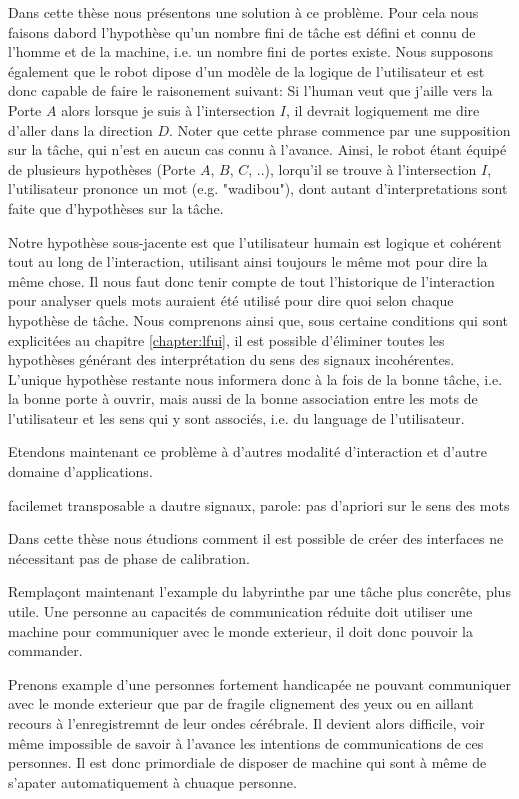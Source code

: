 Dans cette thèse nous présentons une solution à ce problème. Pour cela nous faisons dabord l'hypothèse qu'un nombre fini de tâche est défini et connu de l'homme et de la machine, i.e. un nombre fini de portes existe. Nous supposons également que le robot dipose d'un modèle de la logique de l'utilisateur et est donc capable de faire le raisonement suivant: Si l'human veut que j'aille vers la Porte $A$ alors lorsque je suis à l'intersection $I$, il devrait logiquement me dire d'aller dans la direction $D$. Noter que cette phrase commence par une supposition sur la tâche, qui n'est en aucun cas connu à l'avance. Ainsi, le robot étant équipé de plusieurs hypothèses (Porte $A$, $B$, $C$, ..), lorqu'il se trouve à l'intersection $I$, l'utilisateur prononce un mot (e.g. "wadibou"), dont autant d'interpretations sont faite que d'hypothèses sur la tâche.

Notre hypothèse sous-jacente est que l'utilisateur humain est logique et cohérent tout au long de l'interaction, utilisant ainsi toujours le même mot pour dire la même chose. Il nous faut donc tenir compte de tout l'historique de l'interaction pour analyser quels mots auraient été utilisé pour dire quoi selon chaque hypothèse de tâche. Nous comprenons ainsi que, sous certaine conditions qui sont explicitées au chapitre \ref{chapter:lfui}, il est possible d'éliminer toutes les hypothèses générant des interprétation du sens des signaux incohérentes. L'unique hypothèse restante nous informera donc à la fois de la bonne tâche, i.e. la bonne porte à ouvrir, mais aussi de la bonne association entre les mots de l'utilisateur et les sens qui y sont associés, i.e. du language de l'utilisateur.

Etendons maintenant ce problème à d'autres modalité d'interaction et d'autre domaine d'applications.

facilemet transposable a dautre signaux, parole: pas d'apriori sur le sens des mots

Dans cette thèse nous étudions comment il est possible de créer des interfaces ne nécessitant pas de phase de calibration.

Remplaçont maintenant l'example du labyrinthe par une tâche plus concrête, plus utile. Une personne au capacités de communication réduite doit utiliser une machine pour communiquer avec le monde exterieur, il doit donc pouvoir la commander.

Prenons example d'une personnes fortement handicapée ne pouvant communiquer avec le monde exterieur que par de fragile clignement des yeux ou en aillant recours à l'enregistremnt de leur ondes cérébrale. Il devient alors difficile, voir même impossible de savoir à l'avance les intentions de communications de ces personnes. Il est donc primordiale de disposer de machine qui sont à même de s'apater automatiquement à chuaque personne.

